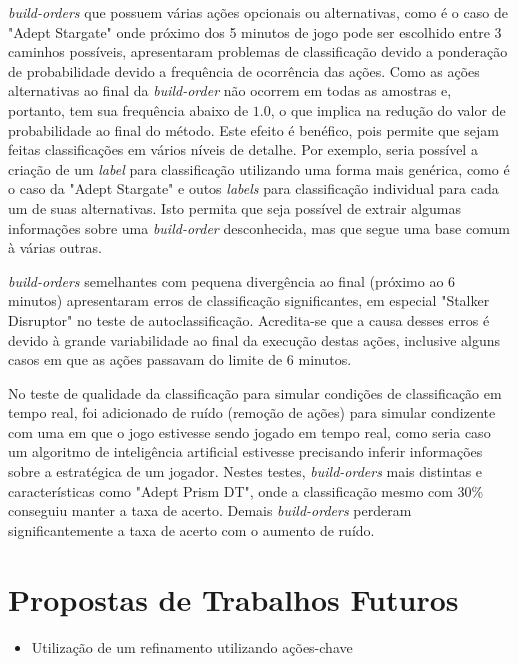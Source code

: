 \textit{\glspl{build-order}} que possuem várias ações opcionais ou alternativas, como é o caso de "Adept Stargate" onde próximo dos 5 minutos de jogo pode ser escolhido entre 3 caminhos possíveis, apresentaram problemas de classificação devido a ponderação de probabilidade devido a frequência de ocorrência das ações. Como as ações alternativas ao final da \textit{\gls{build-order}} não ocorrem em todas as amostras e, portanto, tem sua frequência abaixo de $1.0$, o que implica na redução do valor de probabilidade ao final do método. Este efeito é benéfico, pois permite que sejam feitas classificações em vários níveis de detalhe. Por exemplo, seria possível a criação de um \textit{label} para classificação utilizando uma forma mais genérica, como é o caso da "Adept Stargate" e outos \textit{labels} para classificação individual para cada um de suas alternativas. Isto permita que seja possível de extrair algumas informações sobre uma \textit{\gls{build-order}} desconhecida, mas que segue uma base comum à várias outras.

\textit{\glspl{build-order}} semelhantes com pequena divergência ao final (próximo ao 6 minutos) apresentaram erros de classificação significantes, em especial "Stalker Disruptor" no teste de autoclassificação. Acredita-se que a causa desses erros é devido à grande variabilidade ao final da execução destas ações, inclusive alguns casos em que as ações passavam do limite de 6 minutos.

No teste de qualidade da classificação para simular condições de classificação em tempo real, foi adicionado de ruído (remoção de ações) para simular condizente com uma em que o jogo estivesse sendo jogado em tempo real, como seria caso um algoritmo de inteligência artificial estivesse precisando inferir informações sobre a estratégica de um jogador. Nestes testes, \textit{\glspl{build-order}} mais distintas e características como "Adept Prism DT", onde a classificação mesmo com 30\% conseguiu manter a taxa de acerto. Demais \textit{\glspl{build-order}} perderam significantemente a taxa de acerto com o aumento de ruído.

	\chapter{Propostas de Trabalhos Futuros}
\begin{itemize}
	\item Utilização de um refinamento utilizando ações-chave
\end{itemize}

